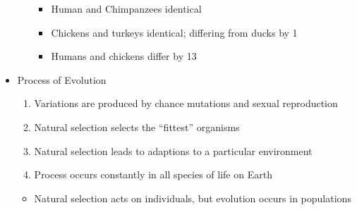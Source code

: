 \documentclass[12pt]{article}
\begin{document}
\begin{itemize}
\begin{itemize}
\begin{itemize}
                \item Human and Chimpanzees identical
                \item Chickens and turkeys identical; differing from ducks by 1
                \item Humans and chickens differ by 13
            \end{itemize}
        \end{itemize}
        \item Process of Evolution
        \begin{enumerate}
            \item Variations are produced by chance mutations and sexual reproduction
            \item Natural selection selects the ``fittest'' organisms
            \item Natural selection leads to adaptions to a particular environment
            \item Process occurs constantly in all species of life on Earth
        \end{enumerate}
        \begin{itemize}
            \item Natural selection acts on individuals, but evolution occurs in populations
        \end{itemize}
    \end{itemize}
\end{document}
